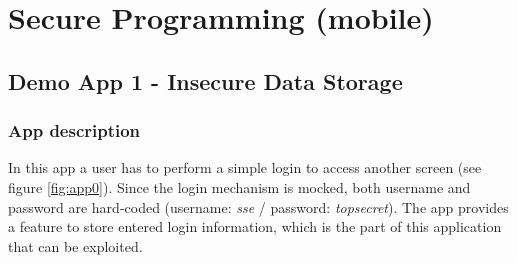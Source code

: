 \section{Secure Programming (mobile)}

\subsection{Demo App 1 - Insecure Data Storage}
\subsubsection{App description}
In this app a user has to perform a simple login to access another screen (see figure \ref{fig:app0}). Since the login mechanism is mocked, both username and password are hard-coded (username: \textit{sse} / password: \textit{topsecret}). The app provides a feature to store entered login information, which is the part of this application that can be exploited.


